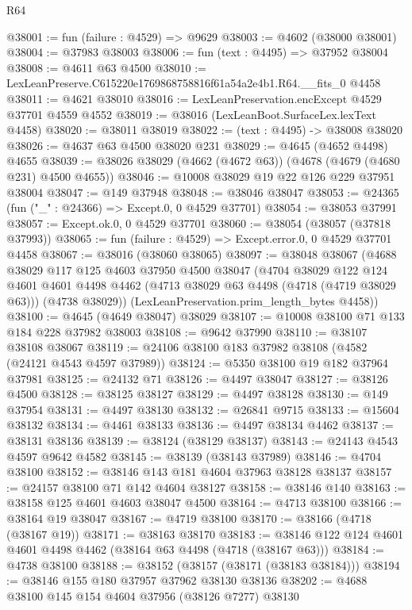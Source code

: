 \begin{lexlean}{R64}
\begin{coremodule}
@38001 := fun (failure : @4529) => @9629
@38003 := @4602 (@38000 @38001)
@38004 := @37983 @38003
@38006 := fun (text : @4495) => @37952 @38004
@38008 := @4611 @63 @4500
@38010 := LexLeanPreserve.C615220e1769868758816f61a54a2e4b1.R64.__fits_0 @4458
@38011 := @4621 @38010
@38016 := LexLeanPreservation.encExcept @4529 @37701 @4559 @4552
@38019 := @38016 (LexLeanBoot.SurfaceLex.lexText @4458)
@38020 := @38011 @38019
@38022 := (text : @4495) -> @38008 @38020
@38026 := @4637 @63 @4500 @38020 @231
@38029 := @4645 (@4652 @4498) @4655
@38039 := @38026 @38029 (@4662 (@4672 @63)) (@4678 (@4679 (@4680 @231) @4500 @4655))
@38046 := @10008 @38029 @19 @22 @126 @229 @37951 @38004
@38047 := @149 @37948
@38048 := @38046 @38047
@38053 := @24365 (fun ("_" : @24366) => Except.{0, 0} @4529 @37701)
@38054 := @38053 @37991
@38057 := Except.ok.{0, 0} @4529 @37701
@38060 := @38054 (@38057 (@37818 @37993))
@38065 := fun (failure : @4529) => Except.error.{0, 0} @4529 @37701 @4458
@38067 := @38016 (@38060 @38065)
@38097 := @38048
    @38067
    (@4688
      @38029
      @117
      @125
      @4603
      @37950
      @4500
      @38047
      (@4704
        @38029
        @122
        @124
        @4601
        @4601
        @4498
        @4462
        (@4713 @38029 @63 @4498 (@4718 (@4719 @38029 @63)))
        (@4738 @38029))
      (LexLeanPreservation.prim_length_bytes @4458))
@38100 := @4645 (@4649 @38047) @38029
@38107 := @10008 @38100 @71 @133 @184 @228 @37982 @38003
@38108 := @9642 @37990
@38110 := @38107 @38108 @38067
@38119 := @24106 @38100 @183 @37982 @38108 (@4582 (@24121 @4543 @4597 @37989))
@38124 := @5350 @38100 @19 @182 @37964 @37981
@38125 := @24132 @71
@38126 := @4497 @38047
@38127 := @38126 @4500
@38128 := @38125 @38127
@38129 := @4497 @38128
@38130 := @149 @37954
@38131 := @4497 @38130
@38132 := @26841 @9715
@38133 := @15604 @38132
@38134 := @4461 @38133
@38136 := @4497 @38134 @4462
@38137 := @38131 @38136
@38139 := @38124 (@38129 @38137)
@38143 := @24143 @4543 @4597 @9642 @4582
@38145 := @38139 (@38143 @37989)
@38146 := @4704 @38100
@38152 := @38146 @143 @181 @4604 @37963 @38128 @38137
@38157 := @24157 @38100 @71 @142 @4604 @38127
@38158 := @38146 @140
@38163 := @38158 @125 @4601 @4603 @38047 @4500
@38164 := @4713 @38100
@38166 := @38164 @19 @38047
@38167 := @4719 @38100
@38170 := @38166 (@4718 (@38167 @19))
@38171 := @38163 @38170
@38183 := @38146 @122 @124 @4601 @4601 @4498 @4462 (@38164 @63 @4498 (@4718 (@38167 @63)))
@38184 := @4738 @38100
@38188 := @38152 (@38157 (@38171 (@38183 @38184)))
@38194 := @38146 @155 @180 @37957 @37962 @38130 @38136
@38202 := @4688 @38100 @145 @154 @4604 @37956 (@38126 @7277) @38130

\end{coremodule}
\end{lexlean}
